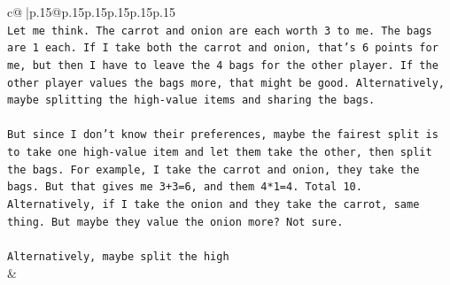 \documentclass{article}
\begin{document}
{\begin{supertabular}{c@{$\;$}|p{.15\linewidth}@{}p{.15\linewidth}p{.15\linewidth}p{.15\linewidth}p{.15\linewidth}p{.15\linewidth}}
{{{\\ 
\texttt{Let me think. The carrot and onion are each worth 3 to me. The bags are 1 each. If I take both the carrot and onion, that's 6 points for me, but then I have to leave the 4 bags for the other player. If the other player values the bags more, that might be good. Alternatively, maybe splitting the high{-}value items and sharing the bags.} \\
\\ 
\texttt{But since I don't know their preferences, maybe the fairest split is to take one high{-}value item and let them take the other, then split the bags. For example, I take the carrot and onion, they take the bags. But that gives me 3+3=6, and them 4*1=4. Total 10. Alternatively, if I take the onion and they take the carrot, same thing. But maybe they value the onion more? Not sure.} \\
\\ 
\texttt{Alternatively, maybe split the high} \\
            }
        }
    }
    & \\ \\


\end{supertabular}}
\end{document}
